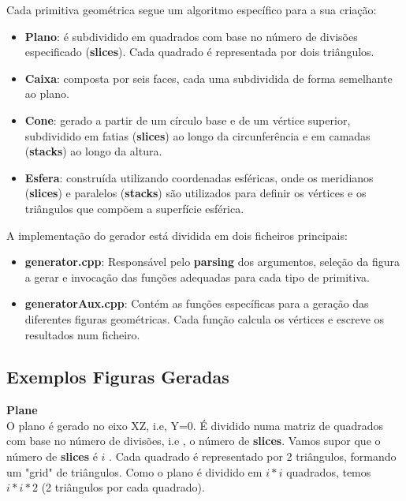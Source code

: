 \documentclass[12pt,a4paper]{report}%
\begin{document}
Cada primitiva geométrica segue um algoritmo específico para a sua criação:

\begin{itemize}
  \item \textbf{Plano}: é subdividido em quadrados com base no número de divisões especificado (\textbf{slices}). Cada quadrado é representada por dois triângulos. 
  \item \textbf{Caixa}: composta por seis faces, cada uma subdividida de forma semelhante ao plano.
  \item \textbf{Cone}: gerado a partir de um círculo base e de um vértice superior, subdividido em fatias (\textbf{slices}) ao longo da circunferência e em camadas (\textbf{stacks}) ao longo da altura.
  \item \textbf{Esfera}: construída utilizando coordenadas esféricas, onde os meridianos (\textbf{slices}) e paralelos (\textbf{stacks}) são utilizados para definir os vértices e os triângulos que compõem a superfície esférica.
\end{itemize}



A implementação do gerador está dividida em dois ficheiros principais:
\begin{itemize}
    \item \textbf{generator.cpp}: Responsável pelo \textbf{parsing} dos argumentos, seleção da figura a gerar e invocação das funções adequadas para cada tipo de primitiva.
    \item \textbf{generatorAux.cpp}: Contém as funções específicas para a geração das diferentes figuras geométricas. Cada função calcula os vértices e escreve os resultados num ficheiro.
\end{itemize}

\subsection{Exemplos Figuras Geradas}

\textbf{Plane} \\

O plano é gerado no eixo XZ, i.e, Y=0. É dividido numa matriz de quadrados com base no número de divisões, i.e , o número de \textbf{slices}. Vamos supor que o número de \textbf{slices} é \(i\) . Cada quadrado é representado por 2 triângulos, formando um "grid" de triângulos. Como o plano é dividido em \(i*i\) quadrados, temos \(i*i*2\)  (2 triângulos por cada quadrado). \\
\end{document}
